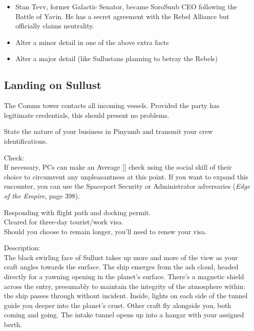 \documentclass{book}
\newcommand{\df}{\difficulty}
\begin{document}
\begin{multicols*}{2}
\begin{itemize}
    \item \triumph Stan Tevv, former Galactic Senator, became SoroSuub CEO following the Battle of Yavin.  He has a secret agreement with the Rebel Alliance but officially claims neutrality.
    \item \threat Alter a minor detail in one of the above extra facts
    \item \despair Alter a major detail (like Sullustans planning to betray the Rebels)
\end{itemize}

    \subsection{Landing on Sullust}
The Comms tower contacts all incoming vessels.  Provided the party has legitimate credentials, this should present no problems.

\begin{quoting}
State the nature of your business in Pinyumb and transmit your crew identifications.
\end{quoting}
Check:\\
If necessary, PCs can make an Average [\df\df] check using the social skill of their choice to circumvent any unpleasantness at this point.  If you want to expand this encounter, you can use the Spaceport Security or Administrator adversaries (\emph{Edge of the Empire}, page 398).
\begin{quoting}
Responding with flight path and docking permit.\\
Cleared for three-day tourist/work visa.\\
Should you choose to remain longer, you’ll need to renew your visa.
\end{quoting}
Description:\\
The black swirling face of Sullust takes up more and more of the view as your craft angles towards the surface. The ship emerges from the ash cloud, headed directly for a yawning opening in the planet’s surface. There’s a magnetic shield across the entry, presumably to maintain the integrity of the atmosphere within: the ship passes through without incident. Inside, lights on each side of the tunnel guide you deeper into the planet’s crust. Other craft fly alongside you, both coming and going. The intake tunnel opens up into a hangar with your assigned berth.


\end{multicols*}
\end{document}
